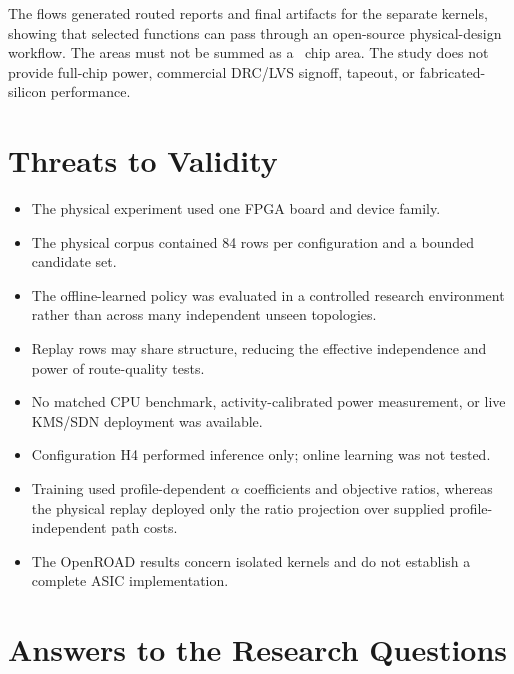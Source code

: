 The flows generated routed reports and final artifacts for the separate kernels,
showing that selected functions can pass through an open-source physical-design
workflow. The areas must not be summed as a \QFlow\ chip area. The study does not
provide full-chip power, commercial DRC/LVS signoff, tapeout, or fabricated-silicon
performance.

\section{Threats to Validity}

\begin{itemize}
  \item The physical experiment used one FPGA board and device family.
  \item The physical corpus contained 84 rows per configuration and a bounded
  candidate set.
  \item The offline-learned policy was evaluated in a controlled research
  environment rather than across many independent unseen topologies.
  \item Replay rows may share structure, reducing the effective independence and
  power of route-quality tests.
  \item No matched CPU benchmark, activity-calibrated power measurement, or live
  KMS/SDN deployment was available.
  \item Configuration H4 performed inference only; online learning was not tested.
  \item Training used profile-dependent $\alpha$ coefficients and objective ratios,
  whereas the physical replay deployed only the ratio projection over supplied
  profile-independent path costs.
  \item The OpenROAD results concern isolated kernels and do not establish a
  complete ASIC implementation.
\end{itemize}

\section{Answers to the Research Questions}

